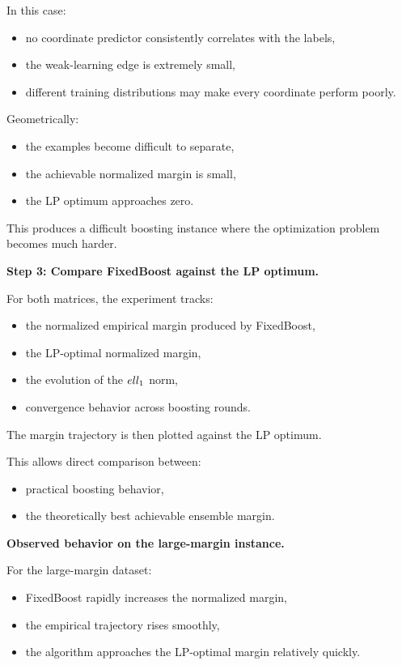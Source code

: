 \documentclass[11pt]{article}
\begin{document}
\begin{enumerate}
\begin{solutionbox}
In this case:
\begin{itemize}
    \item no coordinate predictor consistently correlates with the labels,
    \item the weak-learning edge is extremely small,
    \item different training distributions may make every coordinate perform poorly.
\end{itemize}

Geometrically:
\begin{itemize}
    \item the examples become difficult to separate,
    \item the achievable normalized margin is small,
    \item the LP optimum approaches zero.
\end{itemize}

This produces a difficult boosting instance where the optimization problem becomes much harder.

\medskip

\textbf{Step 3: Compare FixedBoost against the LP optimum.}

For both matrices, the experiment tracks:
\begin{itemize}
    \item the normalized empirical margin produced by FixedBoost,
    \item the LP-optimal normalized margin,
    \item the evolution of the $\\ell_1$ norm,
    \item convergence behavior across boosting rounds.
\end{itemize}

The margin trajectory is then plotted against the LP optimum.

This allows direct comparison between:
\begin{itemize}
    \item practical boosting behavior,
    \item the theoretically best achievable ensemble margin.
\end{itemize}

\medskip

\textbf{Observed behavior on the large-margin instance.}

For the large-margin dataset:
\begin{itemize}
    \item FixedBoost rapidly increases the normalized margin,
    \item the empirical trajectory rises smoothly,
    \item the algorithm approaches the LP-optimal margin relatively quickly.
\end{itemize}


\end{solutionbox}
\end{enumerate}
\end{document}
